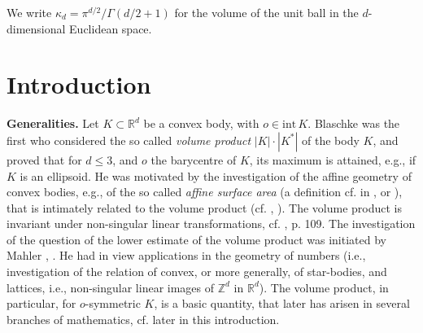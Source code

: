 \documentclass[12pt]{article}
\begin{document}
We write $\kappa _d=\pi ^{d/2}/\Gamma (d/2+1)$ for the volume of the
unit ball in the $d$-dimensional Euclidean space. 




\section{Introduction}

{\bf{Generalities.}}
Let $K \subset {\mathbb R}^d$ 
be a convex body, with $o \in {\text{int}}\,K$. 
Blaschke \cite {Bl} was the 
first who considered the so called {\it{volume product}} $|K| \cdot
|K^*|$ of the body $K$, and proved that for $d \le 3$, and $o$ the barycentre
of $K$, its maximum is attained,
e.g., if $K$ is an ellipsoid. He was motivated by the investigation of
the affine geometry of
convex bodies, e.g., of the so called {\it{affine surface area}} 
(a definition
cf. in \cite{L}, or \cite{Bo}), that is intimately related to the volume
product (cf. \cite{L}, \cite{Bo}).
The volume product is invariant under non-singular
linear transformations, cf. \cite{L},
p. 109. The investigation of the question of the lower estimate
of the volume product was initiated by
Mahler \cite{Mah38}, \cite{Mah39}. He had in view applications in
the geometry of numbers (i.e., investigation of the relation of convex, or
more generally, of star-bodies, 
and lattices, i.e., non-singular linear images
of ${\mathbb Z}^d$ in ${\mathbb R}^d$). The volume product, in particular, 
for
$o$-symmetric $K$, is a basic
quantity, that later has arisen in several branches of mathematics,
cf. later in this introduction.
\end{document}
